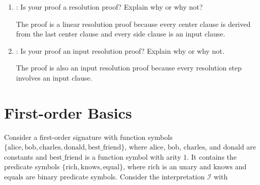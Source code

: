 \documentclass{acAssignment}
\begin{document}
\begin{enumerate}
    \item {}:
        Is your proof a resolution proof?
        Explain why or why not?
        
        \begin{acSolution}
            The proof is a linear resolution proof because every center clause is derived from the last center clause and every side clause is an input clause.
        \end{acSolution}
        
    \item {}:
        Is your proof an input resolution proof? Explain why or why not.
        
        \begin{acSolution}
            The proof is also an input resolution proof because every resolution step involves an input clause.
        \end{acSolution}
\end{enumerate}

\section{First-order Basics}

Consider a first-order signature with function symbols $\{\mathrm{alice, \mathrm{bob}, \mathrm{charles}, \mathrm{donald}, \mathrm{best\_friend}}\}$, where $\mathrm{alice}$, $\mathrm{bob}$, $\mathrm{charles}$, and $\mathrm{donald}$ are constants and $\mathrm{best\_friend}$ is a function symbol with arity $1$.
It contains the predicate symbols $\{\mathrm{rich}, \mathrm{knows}, \mathrm{equal}\}$, where $\mathrm{rich}$ is an unary and $\mathrm{knows}$ and $\mathrm{equals}$ are binary predicate symbols.
Consider the interpretation $\mathcal{I}$ with
\end{document}
